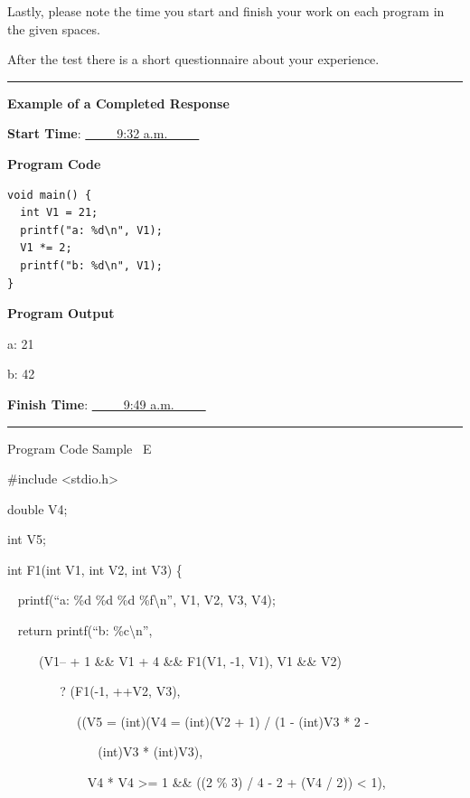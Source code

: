 \documentclass[12pt, a4paper, oneside]{article}
\begin{document}
Lastly, please note the time you start and finish your work on each program in the given spaces.

After the test there is a short questionnaire about your experience.

\begin{center}\rule{0.8\linewidth}{2pt}\end{center}


\textbf{Example of a Completed Response}

\vspace{10pt}

\textbf{Start Time}: \underline{~~~~~9:32 a.m.~~~~~}

\vspace{10pt}

\textbf{Program Code}

\begin{lstlisting}
void main() {
  int V1 = 21;
  printf("a: %d\n", V1);
  V1 *= 2;
  printf("b: %d\n", V1);
}
\end{lstlisting}

\textbf{Program Output}

a: 21

b: 42

\textbf{Finish Time}: \underline{~~~~~9:49 a.m.~~~~~}

\begin{center}\rule{0.8\linewidth}{2pt}\end{center}

  \pagebreak


{Program Code Sample ~E}

{}

{\#include \textless{}stdio.h\textgreater{}}

{double V4;}

{int V5;}

{}

{int F1(int V1, int V2, int V3) \{}

{~ printf(``a: \%d \%d \%d \%f\textbackslash{}n'', V1, V2, V3, V4);}

{~ return printf(``b: \%c\textbackslash{}n'',}

{~ ~ ~ (V1-- + 1 \&\& V1 + 4 \&\& F1(V1, -1, V1), V1 \&\& V2)}

{~ ~ ~ ~ ~ ? (F1(-1, ++V2, V3),}

{~ ~ ~ ~ ~ ~ ~((V5 = (int)(V4 = (int)(V2 + 1) / (1 - (int)V3 * 2 -}

{~ ~ ~ ~ ~ ~ ~ ~ ~(int)V3 * (int)V3),}

{~ ~ ~ ~ ~ ~ ~ ~V4 * V4 \textgreater{}= 1 \&\& ((2 \% 3) / 4 - 2 + (V4 /
2)) \textless{} 1),}
\end{document}
